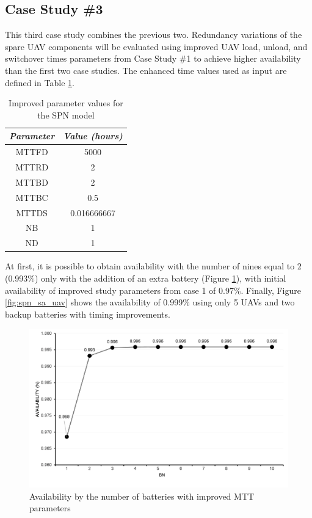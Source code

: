 \documentclass[conference]{IEEEtran}
\begin{document}
\subsection{Case Study \#3}
\label{sec:case_studies_sub03}

This third case study combines the previous two. Redundancy variations of the spare UAV components will be evaluated using improved UAV load, unload, and switchover times parameters from Case Study \#1 to achieve higher availability than the first two case studies. The enhanced time values used as input are defined in Table \ref{tab:spn_parameter_values}.

\begin{table}[htbp]
\caption{Improved parameter values for the SPN model}
\begin{center}
\begin{tabular}{c|c}
\hline
\textbf{\textit{Parameter}} & \textbf{\textit{Value (hours)}} \\
\hline
\hline
 MTTFD & 5000\\
 MTTRD & 2\\
 MTTBD & 2 \\ 
 MTTBC & 0.5 \\
 MTTDS & 0.016666667 \\
 NB & 1 \\
 ND & 1 \\
\hline
\end{tabular}
\label{tab:spn_parameter_values}
\end{center}
\end{table}


At first, it is possible to obtain availability with the number of nines equal to 2 (0.993\%) only with the addition of an extra battery (Figure \ref{fig:spn_sa_battery}), with initial availability of improved study parameters from case 1 of 0.97\%. Finally, Figure \ref{fig:spn_sa_uav} shows the availability of 0.999\% using only 5 UAVs and two backup batteries with timing improvements.

\begin{figure}[htbp]
\centerline{\includegraphics[scale=0.4]{img/exps/SA_005.png}}
\caption{Availability by the number of batteries with improved MTT parameters}
\label{fig:spn_sa_battery}
\end{figure}
\end{document}
